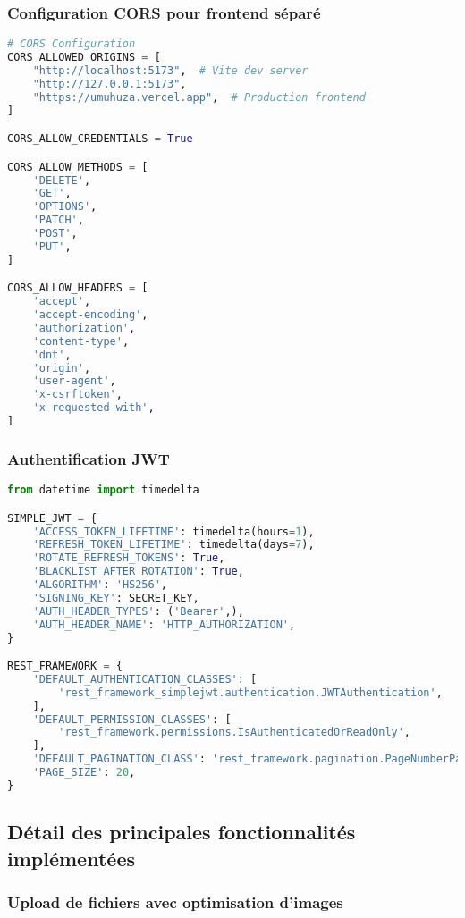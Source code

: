 \subsubsection{Configuration CORS pour frontend séparé}

\begin{lstlisting}[language=Python, caption=umuhuza\_api/settings.py]
# CORS Configuration
CORS_ALLOWED_ORIGINS = [
    "http://localhost:5173",  # Vite dev server
    "http://127.0.0.1:5173",
    "https://umuhuza.vercel.app",  # Production frontend
]

CORS_ALLOW_CREDENTIALS = True

CORS_ALLOW_METHODS = [
    'DELETE',
    'GET',
    'OPTIONS',
    'PATCH',
    'POST',
    'PUT',
]

CORS_ALLOW_HEADERS = [
    'accept',
    'accept-encoding',
    'authorization',
    'content-type',
    'dnt',
    'origin',
    'user-agent',
    'x-csrftoken',
    'x-requested-with',
]
\end{lstlisting}

\subsubsection{Authentification JWT}

\begin{lstlisting}[language=Python, caption=Configuration JWT]
from datetime import timedelta

SIMPLE_JWT = {
    'ACCESS_TOKEN_LIFETIME': timedelta(hours=1),
    'REFRESH_TOKEN_LIFETIME': timedelta(days=7),
    'ROTATE_REFRESH_TOKENS': True,
    'BLACKLIST_AFTER_ROTATION': True,
    'ALGORITHM': 'HS256',
    'SIGNING_KEY': SECRET_KEY,
    'AUTH_HEADER_TYPES': ('Bearer',),
    'AUTH_HEADER_NAME': 'HTTP_AUTHORIZATION',
}

REST_FRAMEWORK = {
    'DEFAULT_AUTHENTICATION_CLASSES': [
        'rest_framework_simplejwt.authentication.JWTAuthentication',
    ],
    'DEFAULT_PERMISSION_CLASSES': [
        'rest_framework.permissions.IsAuthenticatedOrReadOnly',
    ],
    'DEFAULT_PAGINATION_CLASS': 'rest_framework.pagination.PageNumberPagination',
    'PAGE_SIZE': 20,
}
\end{lstlisting}

\subsection{Détail des principales fonctionnalités implémentées}

\subsubsection{Upload de fichiers avec optimisation d'images}

